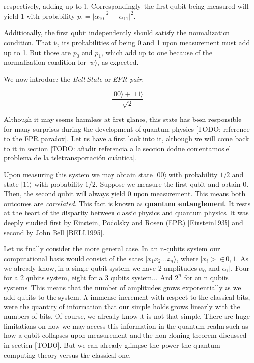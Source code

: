 	respectively, adding up to 1. Correspondingly, the first qubit being measured will yield 1 with probability $p_1 = |\alpha_{10}|^2 + |\alpha_{11}|^2$.
	
	Additionally, the first qubit independently should satisfy the normalization condition. That is, its probabilities of being 0 and 1 upon measurement must add up to 1. But those are $p_0$ and $p_1$, which add up to one because of the normalization condition for $|\psi\rangle$, as expected.
	
	We now introduce the \emph{Bell State} or \emph{EPR pair}:
	
	$$ \frac{ |00\rangle + |11\rangle }{ \sqrt 2 } $$
	
	Although it may seems harmless at first glance, this state has been responsible for many surprises during the development of quantum physics [TODO: reference to the EPR paradox]. Let us have a first look into it, although we will come back to it in section [TODO: añadir referencia a la seccion dodne comentamos el problema de la teletransportación cuántica].
	
	Upon measuring this system we may obtain state $|00\rangle$ with probability $1/2$ and state $|11\rangle$ with probability $1/2$. Suppose we measure the first qubit and obtain 0. Then, the second qubit will always yield 0 upon measurement. This means both outcomes are \emph{correlated}. This fact is known as \textbf{quantum entanglement}. It rests at the heart of the disparity between classic physics and quantum physics. It was deeply studied first by Einstein, Podolsky and Rosen (EPR) \ref{Einstein1935} and second by John Bell \ref{BELL1995}.
	
	Let us finally consider the more general case. In an n-qubits system our computational basis would consist of the sates $|x_1 x_2 \dotsc x_n\rangle$, where $|x_i> \in {0,1}$. As we already know, in a single qubit system we have 2 amplitudes $\alpha_0$ and $\alpha_1|$. Four for a 2 qubits system, eight for a 3 qubits system... And $2^n$ for an n qubits systems. This means that the number of amplitudes grows exponentially as we add qubits to the system. A immense increment with respect to the classical bits, were the quantity of information that our simple holds grows linearly with the numbers of bits. Of course, we already know it is not that simple. There are huge limitations on how we may access this information in the quantum realm such as how a qubit collapses upon measurement and the non-cloning theorem discussed in section [TODO]. But we can already glimpse the power the quantum computing theory versus the classical one.
	
